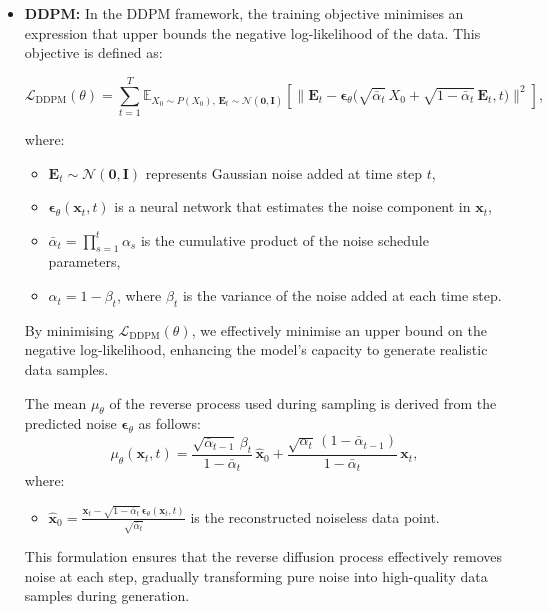 \begin{itemize}
    \item \textbf{DDPM:} In the DDPM framework, the training objective minimises an expression that upper bounds the negative log-likelihood of the data. This objective is defined as:

    \[
    \mathcal{L}_{\text{DDPM}}(\theta) = \sum_{t=1}^T \mathbb{E}_{X_0 \sim P(X_0),\, \mathbf{E}_t \sim \mathcal{N}(\mathbf{0}, \mathbf{I})} \left[ \bigl\| \mathbf{E}_t - \boldsymbol{\epsilon}_\theta\bigl(\sqrt{\bar{\alpha}_t}\, X_0 + \sqrt{1 - \bar{\alpha}_t}\, \mathbf{E}_t, t\bigr) \bigr\|^2 \right],
    \]

    where:
    \begin{itemize}
        \item \( \mathbf{E}_t \sim \mathcal{N}(\mathbf{0}, \mathbf{I}) \) represents Gaussian noise added at time step \( t \),
        \item \( \boldsymbol{\epsilon}_\theta(\mathbf{x}_t, t) \) is a neural network that estimates the noise component in \(\mathbf{x}_t\),
        \item \( \bar{\alpha}_t = \prod_{s=1}^t \alpha_s \) is the cumulative product of the noise schedule parameters,
        \item \( \alpha_t = 1 - \beta_t \), where \( \beta_t \) is the variance of the noise added at each time step.
    \end{itemize}

    By minimising \( \mathcal{L}_{\text{DDPM}}(\theta) \), we effectively minimise an upper bound on the negative log-likelihood, enhancing the model's capacity to generate realistic data samples.

    The mean \( \mu_\theta \) of the reverse process used during sampling is derived from the predicted noise \( \mathbf{\epsilon}_\theta \) as follows:
    \[
    \mu_\theta(\mathbf{x}_t, t) = \frac{\sqrt{\bar{\alpha}_{t-1}}\, \beta_t}{1 - \bar{\alpha}_t}\, \hat{\mathbf{x}}_0 + \frac{\sqrt{\alpha_t}\, (1 - \bar{\alpha}_{t-1})}{1 - \bar{\alpha}_t}\, \mathbf{x}_t,
    \]
    where:
    \begin{itemize}
        \item \( \hat{\mathbf{x}}_0 = \frac{\mathbf{x}_t - \sqrt{1 - \bar{\alpha}_t}\, \mathbf{\epsilon}_\theta(\mathbf{x}_t, t)}{\sqrt{\bar{\alpha}_t}} \) is the reconstructed noiseless data point.
    \end{itemize}

    This formulation ensures that the reverse diffusion process effectively removes noise at each step, gradually transforming pure noise into high-quality data samples during generation.



\end{itemize}
